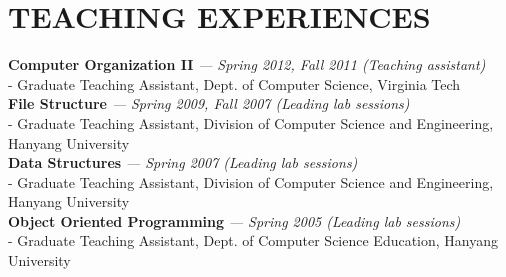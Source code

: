\section{TEACHING EXPERIENCES} 
\vspace{0.07in} 
   {\bf Computer Organization II}
   {\it \footnotesize --- Spring 2012, Fall 2011 (Teaching assistant)}\\
      - {\small Graduate Teaching Assistant, Dept. of Computer Science, Virginia
      Tech}
\vspace{0.02in}\\
   {\bf File Structure}
   {\it \footnotesize --- Spring 2009, Fall 2007 (Leading lab sessions)}\\
      - {\small Graduate Teaching Assistant, Division of Computer Science and
      Engineering, Hanyang University}
\vspace{0.02in}\\
   {\bf Data Structures}
   {\it \footnotesize --- Spring 2007 (Leading lab sessions)}\\
      - {\small Graduate Teaching Assistant, Division of Computer Science and
      Engineering, Hanyang University}
\vspace{0.02in}\\
   {\bf Object Oriented Programming}
   {\it \footnotesize --- Spring 2005 (Leading lab sessions)}\\
      - {\small Graduate Teaching Assistant, Dept. of Computer Science
      Education, Hanyang University}

